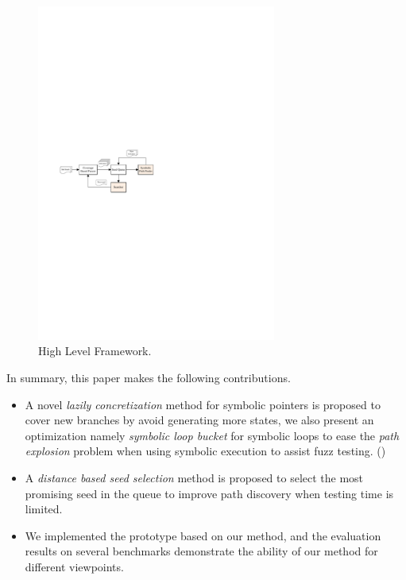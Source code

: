 \begin{figure}
\begin{center}
\includegraphics[width=0.7\textwidth]{figures/framework.pdf} 
\caption{High Level Framework.}\label{Framework}
\end{center}
\end{figure}


{\color{red}{This introduction is better now. Still much work should be done on the contribution part.
 Let's proceed this way. 
 Remove the duplications first. What you present above overlaps the following summary.
 Try to present a general workflow of your method, and your contributions using the figure you have.
 You are explaining the boxes of the figure.
 It would be better to state your contributions with the help of the figure. }}


In summary, this paper makes the following contributions.
\begin{itemize}
\item A novel \emph{lazily concretization} method for symbolic pointers is 
 proposed to cover new branches by avoid generating more states, 
 we also present an optimization namely \emph{symbolic loop bucket} 
 for symbolic loops to ease the \emph{path explosion} problem when using symbolic execution to assist fuzz testing.
 ({\color{red}{What is lazily concretization? concretation of what? There are two sentences, comma is not misued.}})

\item A \emph{distance based seed selection} method is proposed to select the most promising seed 
 in the queue to improve path discovery when testing time is limited. 

\item We implemented the prototype based on our method, 
 and the evaluation results on several benchmarks demonstrate the ability of our method for different viewpoints.
\end{itemize}


